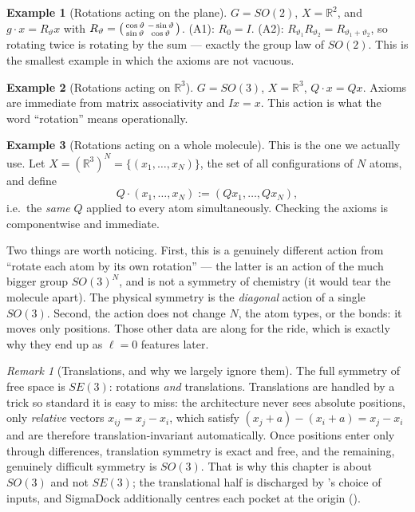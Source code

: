 \documentclass[11pt,a4paper]{report}
\theoremstyle{definition}
\newtheorem{example}[example]{Example}
\theoremstyle{remark}
\newtheorem{remark}[remark]{Remark}
\newcommand{\RR}{\mathbb R}
\begin{document}
\begin{example}[Rotations acting on the plane]
\label{ex:action-r2}
$G=SO(2)$, $X=\RR^2$, and $g\cdot x = R_\vartheta x$ with
$R_\vartheta=\begin{psmallmatrix}\cos\vartheta&-\sin\vartheta\\ \sin\vartheta&\cos\vartheta\end{psmallmatrix}$.
(A1): $R_0=I$. (A2): $R_{\vartheta_1}R_{\vartheta_2}=R_{\vartheta_1+\vartheta_2}$,
so rotating twice is rotating by the sum --- exactly the group law of
$SO(2)$. This is the smallest example in which the axioms are not vacuous.
\end{example}

\begin{example}[Rotations acting on $\RR^3$]
$G=SO(3)$, $X=\RR^3$, $Q\cdot x = Qx$. Axioms are immediate from matrix
associativity and $I x=x$. This action is what the word ``rotation'' means
operationally.
\end{example}

\begin{example}[Rotations acting on a whole molecule]
\label{ex:action-molecule}
This is the one we actually use. Let
$X=(\RR^3)^N=\{(x_1,\dots,x_N)\}$, the set of all configurations of $N$
atoms, and define
\[
Q\cdot(x_1,\dots,x_N) := (Qx_1,\dots,Qx_N) ,
\]
i.e.\ the \emph{same} $Q$ applied to every atom simultaneously. Checking the
axioms is componentwise and immediate.

Two things are worth noticing. First, this is a genuinely different action
from ``rotate each atom by its own rotation'' --- the latter is an action of
the much bigger group $SO(3)^N$, and is not a symmetry of chemistry
(it would tear the molecule apart). The physical symmetry is the
\emph{diagonal} action of a single $SO(3)$. Second, the action does not
change $N$, the atom types, or the bonds: it moves only positions. Those
other data are along for the ride, which is exactly why they end up as
$\ell=0$ features later.
\end{example}

\begin{remark}[Translations, and why we largely ignore them]
\label{rem:translations-quotient}
The full symmetry of free space is $SE(3)$: rotations \emph{and}
translations. Translations are handled by a trick so standard it is easy to
miss: the architecture never sees absolute positions, only \emph{relative}
vectors $x_{ij}=x_j-x_i$, which satisfy
$(x_j+a)-(x_i+a)=x_j-x_i$ and are therefore translation-invariant
automatically. Once positions enter only through differences, translation
symmetry is exact and free, and the remaining, genuinely difficult symmetry
is $SO(3)$. That is why this chapter is about $SO(3)$ and not $SE(3)$; the
translational half is discharged by 's
choice of inputs, and SigmaDock additionally centres each pocket at the
origin ().
\end{remark}
\end{document}
